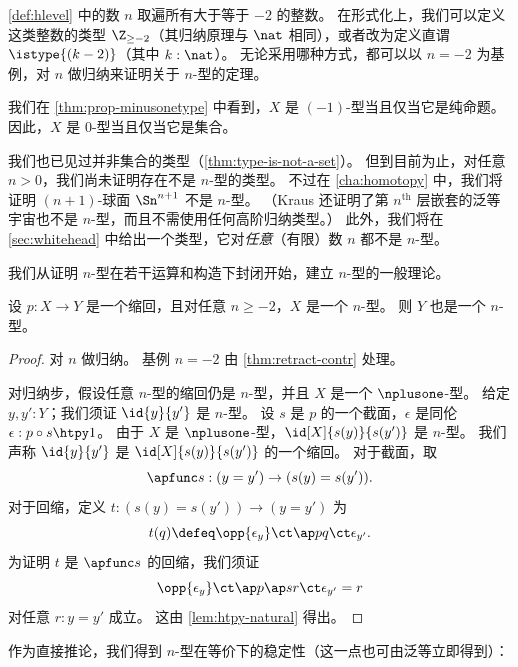 \begin{rmk}
  \cref{def:hlevel} 中的数 $n$ 取遍所有大于等于 $-2$ 的整数。
  在形式化上，我们可以定义这类整数的类型 $\Z_{{\geq}-2}$（其归纳原理与 $\nat$ 相同），或者改为定义直谓 $\istype{(k-2)}$（其中 $k : \nat$）。
  无论采用哪种方式，都可以以 $n=-2$ 为基例，对 $n$ 做归纳来证明关于 $n$-型的定理。
\end{rmk}

\begin{eg}
  我们在 \cref{thm:prop-minusonetype} 中看到，$X$ 是 $(-1)$-型当且仅当它是纯命题。
  因此，$X$ 是 $0$-型当且仅当它是集合。
\end{eg}

我们也已见过并非集合的类型（\cref{thm:type-is-not-a-set}）。
但到目前为止，对任意 $n>0$，我们尚未证明存在不是 $n$-型的类型。
不过在 \cref{cha:homotopy} 中，我们将证明 $(n+1)$-球面 $\Sn^{n+1}$ 不是 $n$-型。
（Kraus 还证明了第 $n^{\mathrm{th}}$ 层嵌套的泛等宇宙也不是 $n$-型，而且不需使用任何高阶归纳类型。）
此外，我们将在 \cref{sec:whitehead} 中给出一个类型，它对\emph{任意}（有限）数 $n$ 都不是 $n$-型。

我们从证明 $n$-型在若干运算和构造下封闭开始，建立 $n$-型的一般理论。

\begin{thm}\label{thm:h-level-retracts}
 设 $p : X \to Y$ 是一个缩回，且对任意 $n\geq -2$，$X$ 是一个 $n$-型。
 则 $Y$ 也是一个 $n$-型。
\end{thm}

\begin{proof}
 对 $n$ 做归纳。
 基例 $n=-2$ 由 \cref{thm:retract-contr} 处理。

 对归纳步，假设任意 $n$-型的缩回仍是 $n$-型，并且 $X$ 是一个 $\nplusone$-型。
 给定 $y, y' : Y$；我们须证 $\id{y}{y'}$ 是 $n$-型。
 设 $s$ 是 $p$ 的一个截面，$\epsilon$ 是同伦 $\epsilon : p \circ s \htpy 1$。
 由于 $X$ 是 $\nplusone$-型，$\id[X]{s(y)}{s(y')}$ 是 $n$-型。
 我们声称 $\id{y}{y'}$ 是 $\id[X]{s(y)}{s(y')}$ 的一个缩回。
 对于截面，取
 \[ \apfunc s : (y=y') \to (s(y)=s(y')). \]
 对于回缩，定义 $t:(s(y)=s(y'))\to(y=y')$ 为
 \[ t(q) \defeq  \opp{\epsilon_y} \ct \ap p q \ct \epsilon_{y'}.\]
 为证明 $t$ 是 $\apfunc s$ 的回缩，我们须证
 \[ \opp{\epsilon_y} \ct \ap p {\ap sr} \ct \epsilon_{y'} = r \]
 对任意 $r:y=y'$ 成立。
 这由 \cref{lem:htpy-natural} 得出。
\end{proof}

作为直接推论，我们得到 $n$-型在等价下的稳定性（这一点也可由泛等立即得到）：


